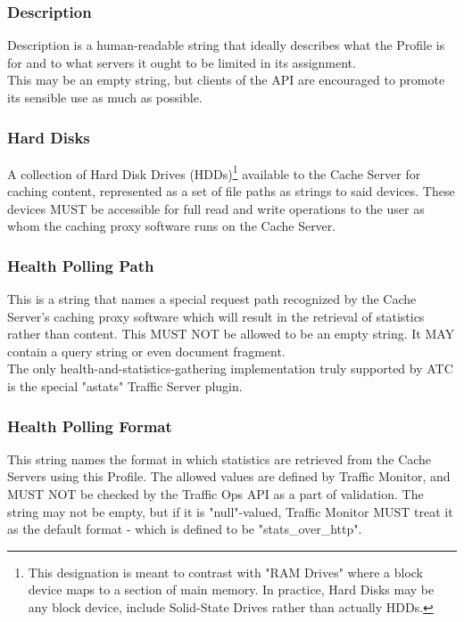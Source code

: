 \subsubsection{Description}
Description is a human-readable string that ideally describes what the Profile
is for and to what servers it ought to be limited in its assignment.\\
This may be an empty string, but clients of the API are encouraged to promote
its sensible use as much as possible.

\subsubsection{Hard Disks}
A collection of Hard Disk Drives (HDDs)\footnote{This designation is meant to
contrast with "RAM Drives" where a block device maps to a section of main
memory. In practice, Hard Disks may be any block device, include Solid-State
Drives rather than actually HDDs.} available to the Cache Server for caching
content, represented as a set of file paths as strings to said devices. These
devices MUST be accessible for full read and write operations to the user as
whom the caching proxy software runs on the Cache Server.

\subsubsection{Health Polling Path}
This is a string that names a special request path recognized by the Cache
Server's caching proxy software which will result in the retrieval of statistics
rather than content. This MUST NOT be allowed to be an empty string. It MAY
contain a query string or even document fragment.\\
The only health-and-statistics-gathering implementation truly supported by ATC
is the special "astats" Traffic Server plugin.

\subsubsection{Health Polling Format}
This string names the format in which statistics are retrieved from the Cache
Servers using this Profile. The allowed values are defined by Traffic Monitor,
and MUST NOT be checked by the Traffic Ops API as a part of validation. The
string may not be empty, but if it is "null"-valued, Traffic Monitor MUST treat
it as the default format - which is defined to be "stats\_over\_http".

